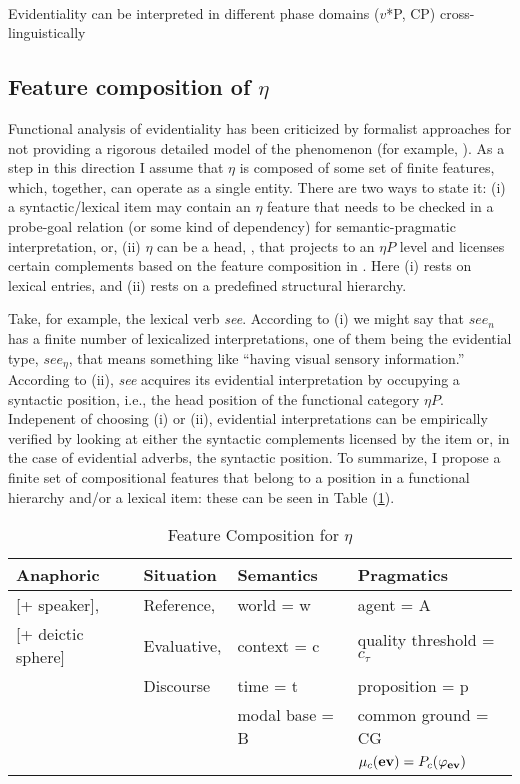 \documentclass[11pt]{article}
\begin{document}
\begin{exe}
\\
Evidentiality can be interpreted in different phase domains ($v$*P, CP) cross-linguistically
\end{exe}      

\subsection{Feature composition of $\eta$}\label{etacomp} 
Functional analysis of evidentiality has been criticized by formalist approaches for not providing a rigorous detailed model of the phenomenon (for example, ). As a step in this direction I assume that $\eta$ is composed of some set of finite features, which, together, can operate as a single entity. There are two ways to state it: (i) a syntactic/lexical item may contain an $\eta$ feature that needs to be checked in a probe-goal relation (or some kind of dependency) for semantic-pragmatic interpretation, or, (ii) $\eta$ can be a head, \obar{$\eta$}, that projects to an $\eta P$ level and licenses certain complements based on the feature composition in \obar{$\eta$}. Here (i) rests on lexical entries, and (ii) rests on a predefined structural hierarchy.

Take, for example, the lexical verb \textsl{see}. According to (i) we might say that $see_{n}$ has a finite number of lexicalized interpretations, one of them being the evidential type, $see_{\eta}$, that means something like ``having visual sensory information.'' According to (ii), \textsl{see} acquires its evidential interpretation by occupying a syntactic position, i.e., the head position of the functional category $\eta P$. Indepenent of choosing (i) or (ii), evidential interpretations can be empirically verified by looking at either the syntactic complements licensed by the item or, in the case of evidential adverbs, the syntactic position. To summarize, I propose a finite set of compositional features that belong to a position in a functional hierarchy and/or a lexical item: these can be seen in Table (\ref{featuretable}).

\begin{table}[!h]
\caption{Feature Composition for $\eta$}\label{featuretable}
\begin{tabular}{|l||l||l||l|}
\hline
{\sc Anaphoric} & {\sc Situation} & {\sc Semantics} & {\sc Pragmatics}\\
\hline
\hline
{}[+ speaker],       & Reference,  & world = w         & agent = A\\ 
{}[+ deictic sphere] & Evaluative, & context = c       & quality threshold = $c_{\tau}$\\
{}                   & Discourse   & time = t          & proposition = p\\
{}                   & {}          & modal base = B    & common ground = CG\\
{}                   & {}          & {}                & $\mu_ {c}({\bf ev}) = P_{c}(\varphi_{{\bf ev}})$\\ 
\hline 
\end{tabular}
\end{table} 
\end{document}
